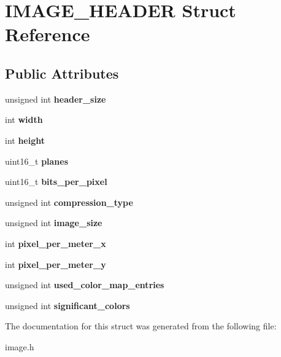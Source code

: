 \hypertarget{structIMAGE__HEADER}{}\section{I\+M\+A\+G\+E\+\_\+\+H\+E\+A\+D\+ER Struct Reference}
\label{structIMAGE__HEADER}
\subsection*{Public Attributes}
\begin{DoxyCompactItemize}
\item 
\mbox{\label{structIMAGE__HEADER_a9a4b334752a6cefe8ab3d670c1b9cf06}} 
unsigned int {\bfseries header\+\_\+size}
\item 
\mbox{\label{structIMAGE__HEADER_a8b50b2758ee52dde72bc8d09f00ec5e6}} 
int {\bfseries width}
\item 
\mbox{\label{structIMAGE__HEADER_acaaebfd532c73cc1a23132eb7b904684}} 
int {\bfseries height}
\item 
\mbox{\label{structIMAGE__HEADER_a965779fd34740d2fd1e53fa0420934b4}} 
uint16\+\_\+t {\bfseries planes}
\item 
\mbox{\label{structIMAGE__HEADER_a39639dccddac3cd2ff5f6a0acfe4f0e7}} 
uint16\+\_\+t {\bfseries bits\+\_\+per\+\_\+pixel}
\item 
\mbox{\label{structIMAGE__HEADER_a5d68c763f144d0e24ae65768a43b4a01}} 
unsigned int {\bfseries compression\+\_\+type}
\item 
\mbox{\label{structIMAGE__HEADER_a1214b873edf18e7182b8dc6c82f3a85e}} 
unsigned int {\bfseries image\+\_\+size}
\item 
\mbox{\label{structIMAGE__HEADER_a88c15abd1de4f3999bf5947b447c83ad}} 
int {\bfseries pixel\+\_\+per\+\_\+meter\+\_\+x}
\item 
\mbox{\label{structIMAGE__HEADER_a1510e52b3237efd9d57a144493292212}} 
int {\bfseries pixel\+\_\+per\+\_\+meter\+\_\+y}
\item 
\mbox{\label{structIMAGE__HEADER_ac5677e8243f351bdf6afb909267f566c}} 
unsigned int {\bfseries used\+\_\+color\+\_\+map\+\_\+entries}
\item 
\mbox{\label{structIMAGE__HEADER_a5f1fb2a8d4c6946dc16a2f83fe45326a}} 
unsigned int {\bfseries significant\+\_\+colors}
\end{DoxyCompactItemize}


The documentation for this struct was generated from the following file\+:\begin{DoxyCompactItemize}
\item 
image.\+h\end{DoxyCompactItemize}
